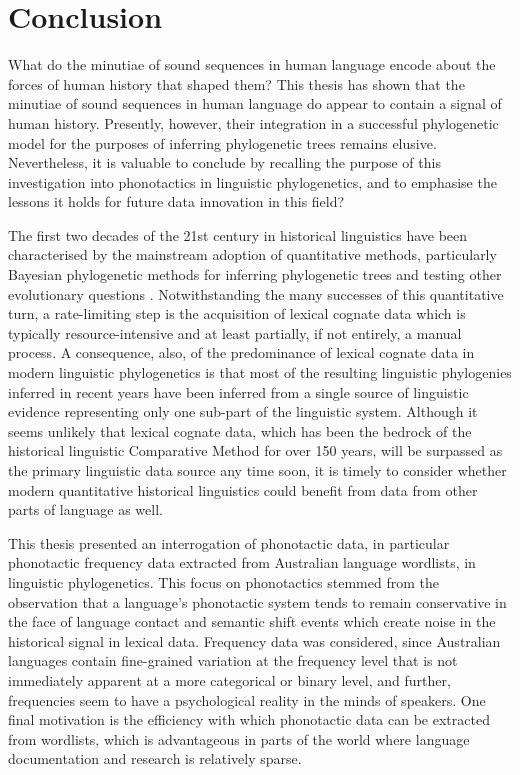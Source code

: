 \chapter[Conclusion]{Conclusion}
\label{ch-conclusion}


What do the minutiae of sound sequences in human language encode about the forces of human history that shaped them? This thesis has shown that the minutiae of sound sequences in human language do appear to contain a signal of human history. Presently, however, their integration in a successful phylogenetic model for the purposes of inferring phylogenetic trees remains elusive. Nevertheless, it is valuable to conclude by recalling the purpose of this investigation into phonotactics in linguistic phylogenetics, and to emphasise the lessons it holds for future data innovation in this field?

The first two decades of the 21st century in historical linguistics have been characterised by the mainstream adoption of quantitative methods, particularly Bayesian phylogenetic methods for inferring phylogenetic trees and testing other evolutionary questions \autocites[see][]{dunn_language_2015}{bowern_computational_2018}. Notwithstanding the many successes of this quantitative turn, a rate-limiting step is the acquisition of lexical cognate data which is typically resource-intensive and at least partially, if not entirely, a manual process. A consequence, also, of the predominance of lexical cognate data in modern linguistic phylogenetics is that most of the resulting linguistic phylogenies inferred in recent years have been inferred from a single source of linguistic evidence representing only one sub-part of the linguistic system. Although it seems unlikely that lexical cognate data, which has been the bedrock of the historical linguistic Comparative Method for over 150 years, will be surpassed as the primary linguistic data source any time soon, it is timely to consider whether modern quantitative historical linguistics could benefit from data from other parts of language as well.

This thesis presented an interrogation of phonotactic data, in particular phonotactic frequency data extracted from Australian language wordlists, in linguistic phylogenetics. This focus on phonotactics stemmed from the observation that a language's phonotactic system tends to remain conservative in the face of language contact and semantic shift events which create noise in the historical signal in lexical data. Frequency data was considered, since Australian languages contain fine-grained variation at the frequency level that is not immediately apparent at a more categorical or binary level, and further, frequencies seem to have a psychological reality in the minds of speakers. One final motivation is the efficiency with which phonotactic data can be extracted from wordlists, which is advantageous in parts of the world where language documentation and research is relatively sparse.

